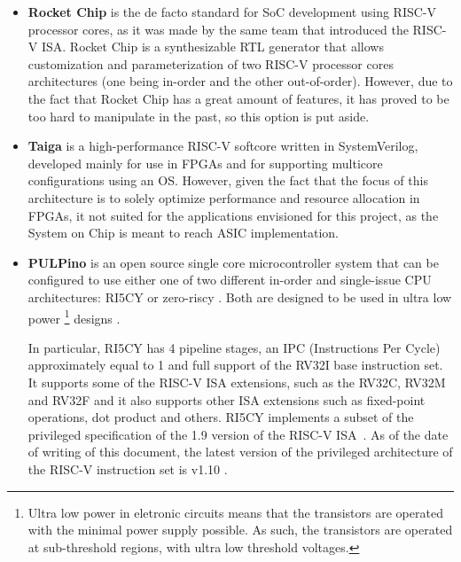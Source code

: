 \begin{itemize}
	
	\item \textbf{Rocket Chip} \cite{bib:rocketchip} is the de facto
          standard for SoC development using RISC-V processor cores, as it was
          made by the same team that introduced the RISC-V ISA. Rocket Chip is a
          synthesizable RTL generator that allows customization and
          parameterization of two RISC-V processor cores architectures (one
          being in-order and the other out-of-order). However, due to the fact
          that Rocket Chip has a great amount of features, it has proved to be
          too hard to manipulate in the past, so this option is put aside.
	
	\item \textbf{Taiga} \cite{bib:taiga} is a high-performance RISC-V
          softcore written in SystemVerilog, developed mainly for use in FPGAs
          and for supporting multicore configurations using an OS. However,
          given the fact that the focus of this architecture is to solely
          optimize performance and resource allocation in FPGAs, it not suited
          for the applications envisioned for this project, as the \socname
          System on Chip is meant to reach ASIC implementation.
	
	\item \textbf{PULPino} \cite{bib:pulpino} is an open source single core
          microcontroller system that can be configured to use either one of two
          different in-order and single-issue CPU architectures: RI5CY
          \cite{bib:riscy} or zero-riscy \cite{bib:zeroriscy}. Both are designed
          to be used in ultra low power \footnote{Ultra low power in eletronic
            circuits means that the transistors are operated with the minimal
            power supply possible. As such, the transistors are operated at
            sub-threshold regions, with ultra low threshold voltages.} designs
          \cite{bib:ultralowpower}.
	
	In particular, RI5CY has 4 pipeline stages, an IPC (Instructions Per
        Cycle) approximately equal to 1 \cite{bib:riscvmanual} and full support
        of the RV32I base instruction set. It supports some of the RISC-V ISA
        extensions, such as the RV32C, RV32M and RV32F and it also supports
        other ISA extensions such as fixed-point operations, dot product and
        others. RI5CY implements a subset of the privileged specification of the
        1.9 version of the RISC-V ISA~\cite{bib:riscvprivileged19}. As of the
        date of writing of this document, the latest version of the privileged
        architecture of the RISC-V instruction set is v1.10
        \cite{bib:riscvprivileged110}.
	

\end{itemize}
